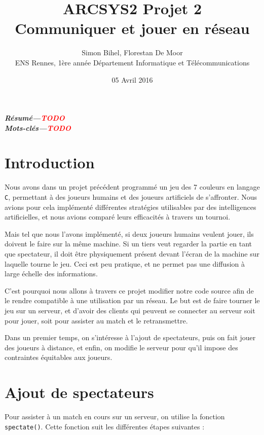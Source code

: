\documentclass[a4paper]{article}
\providecommand{\resume}[1]{\textbf{\textit{Résumé---#1}}}
\providecommand{\keywords}[1]{\textbf{\textit{Mots-clés---#1}}}
\newcommand{\TODO}{\textcolor{red}{\textbf{TODO}}}
\begin{document}
\title{ARCSYS2 Projet 2%
	\\ Communiquer et jouer en réseau}
\author{Simon Bihel, Florestan De Moor%
	 \\ ENS Rennes, 1ère année Département Informatique et Télécommunications}
\date{05 Avril 2016}

\maketitle

\resume{\TODO}\\

\keywords{\TODO}

\section*{Introduction}


Nous avons dans un projet précédent programmé un jeu des 7 couleurs en langage 
\texttt{C}, permettant à des joueurs humains et des joueurs artificiels de 
s'affronter. Nous avions pour cela implémenté différentes stratégies 
utilisables par des intelligences artificielles, et nous avions comparé leurs 
efficacités à travers un tournoi.

Mais tel que nous l'avons implémenté, si deux joueurs humains veulent jouer, 
ils doivent le faire sur la même machine. Si un tiers veut regarder la partie 
en tant que spectateur, il doit être physiquement présent devant l'écran de la 
machine sur laquelle tourne le jeu. Ceci est peu pratique, et ne permet pas une 
diffusion à large échelle des informations.

C'est pourquoi nous allons à travers ce projet modifier notre code source afin 
de le rendre compatible à une utilisation par un réseau. Le but est de faire 
tourner le jeu sur un serveur, et d'avoir des clients qui peuvent se connecter 
au serveur soit pour jouer, soit pour assister au match et le retransmettre.

Dans un premier temps, on s'intéresse à l'ajout de spectateurs, puis on fait jouer des joueurs à distance, et enfin, on modifie le serveur pour qu'il impose des contraintes équitables aux joueurs.

\section{Ajout de spectateurs}


Pour assister à un match en cours sur un serveur, on utilise la fonction \texttt{spectate()}. Cette fonction suit les différentes étapes suivantes :
\end{document}
